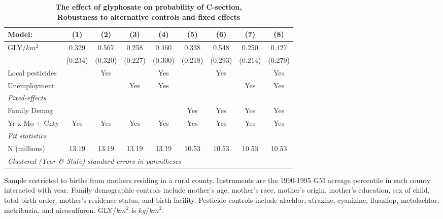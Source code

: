 \begin{table}[htbp]
   \centering
   \small
   \begin{threeparttable}[b]
      \caption{\label{tab:robust-cntrl-c_section-percentilegmacres} \textbf{The effect of glyphosate on probability of C-section, \\ Robustness to alternative controls and fixed effects}}
      \begin{tabular}{lcccccccc}
         \toprule
         Model:           & (1)     & (2)     & (3)     & (4)     & (5)     & (6)     & (7)     & (8)\\  
         \midrule 
         GLY/$km^2$       & 0.329   & 0.567   & 0.258   & 0.460   & 0.338   & 0.548   & 0.250   & 0.427\\   
                          & (0.234) & (0.320) & (0.227) & (0.300) & (0.218) & (0.293) & (0.214) & (0.279)\\   
         Local pesticides &         & Yes     &         & Yes     &         & Yes     &         & Yes\\  
         Unemployment     &         &         & Yes     & Yes     &         &         & Yes     & Yes\\  
         \midrule
         \emph{Fixed-effects}\\
         Family Demog     &         &         &         &         & Yes     & Yes     & Yes     & Yes\\  
         Yr x Mo + Cnty   & Yes     & Yes     & Yes     & Yes     & Yes     & Yes     & Yes     & Yes\\  
         \midrule
         \emph{Fit statistics}\\
         N (millions)     & 13.19   & 13.19   & 13.19   & 13.19   & 10.53   & 10.53   & 10.53   & 10.53\\  
         \midrule
         \multicolumn{9}{l}{\emph{Clustered (Year \& State) standard-errors in parentheses}}\\
      \end{tabular}
      
      \begin{tablenotes}\item Sample restricted to births from mothers residing in a rural county. Instruments are the 1990-1995 GM acreage percentile in each county interacted with year. Family demographic controls include mother's age, mother's race, mother's origin, mother's education, sex of child, total birth order, mother's residence status, and birth facility. Pesticide controls include alachlor, atrazine, cyanizine, fluazifop, metolachlor, metribuzin, and nicosulfuron. GLY/$km^2$ is $kg/km^2$.
      \end{tablenotes}
   \end{threeparttable}
\end{table}
